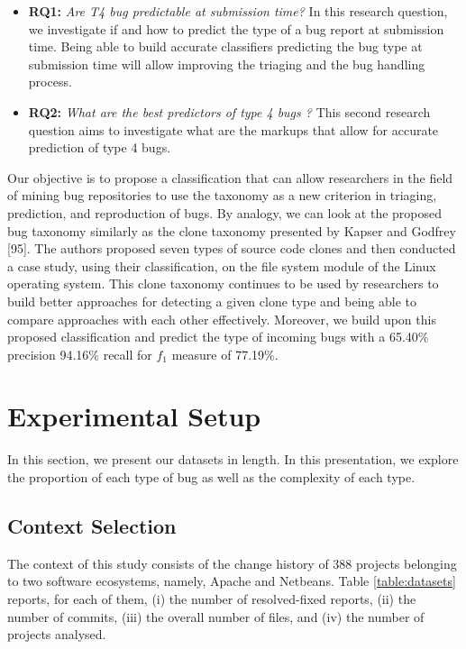 \documentclass[12pt]{report}
\providecommand{\tightlist}{%
  \setlength{\itemsep}{0pt}\setlength{\parskip}{0pt}}
\begin{document}
\begin{itemize}
\tightlist
\item
  \textbf{RQ1:} \emph{Are T4 bug predictable at submission time?} In
  this research question, we investigate if and how to predict the type
  of a bug report at submission time. Being able to build accurate
  classifiers predicting the bug type at submission time will allow
  improving the triaging and the bug handling process.
\item
  \textbf{RQ2:} \emph{What are the best predictors of type 4 bugs ?}
  This second research question aims to investigate what are the markups
  that allow for accurate prediction of type 4 bugs.
\end{itemize}

Our objective is to propose a classification that can allow researchers
in the field of mining bug repositories to use the taxonomy as a new
criterion in triaging, prediction, and reproduction of bugs. By analogy,
we can look at the proposed bug taxonomy similarly as the clone taxonomy
presented by Kapser and Godfrey {[}95{]}. The authors proposed seven
types of source code clones and then conducted a case study, using their
classification, on the file system module of the Linux operating system.
This clone taxonomy continues to be used by researchers to build better
approaches for detecting a given clone type and being able to compare
approaches with each other effectively. Moreover, we build upon this
proposed classification and predict the type of incoming bugs with a
65.40\% precision 94.16\% recall for \(f_1\) measure of 77.19\%.

\section{Experimental Setup}\label{experimental-setup-4}

In this section, we present our datasets in length. In this
presentation, we explore the proportion of each type of bug as well as
the complexity of each type.

\subsection{\texorpdfstring{Context
Selection\label{sec:context-selection}}{Context Selection}}\label{context-selection}

The context of this study consists of the change history of 388 projects
belonging to two software ecosystems, namely, Apache and Netbeans. Table
\ref{table:datasets} reports, for each of them, (i) the number of
resolved-fixed reports, (ii) the number of commits, (iii) the overall
number of files, and (iv) the number of projects analysed.
\end{document}

